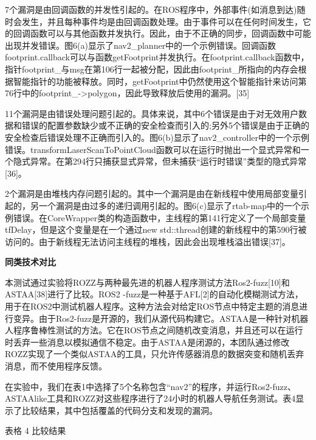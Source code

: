 7个漏洞是由回调函数的并发性引起的。在ROS程序中，外部事件(如消息到达)随时会发生，并且每种事件均是由回调函数处理。由于事件可以在任何时间发生，它的回调函数可以与其他函数并发执行。因此，由于不正确的同步，回调函数中可能出现并发错误。图6(a)显示了nav2\_planner中的一个示例错误。回调函数footprint.callback可以与函数getFootprint并发执行。在footprint.callback函数中，指针footprint\_与msg在第106行一起被分配，因此由footprint\_所指向的内存会根据智能指针的功能被释放。同时，getFootprint中仍然使用这个智能指针来访问第76行中的footprint\_-\textgreater polygon，因此导致释放后使用的漏洞。{[}35{]}

11个漏洞是由错误处理问题引起的。具体来说，其中6个错误是由于对无效用户数据和错误的配置参数缺少或不正确的安全检查而引入的;另外5个错误是由于正确的安全检查后错误处理不正确而引入的。图6(b)显示了nav2\_controller中的一个示例错误。transformLaserScanToPointCloud函数可以在运行时抛出一个显式异常和一个隐式异常。在第294行只捕获显式异常，但未捕获``运行时错误''类型的隐式异常{[}36{]}。

2个漏洞是由堆栈内存问题引起的。其中一个漏洞是由在新线程中使用局部变量引起的，另一个漏洞是由过多的递归调用引起的。图6(c)显示了rtab-map中的一个示例错误。在CoreWrapper类的构造函数中，主线程的第141行定义了一个局部变量tfDelay，但是这个变量是在一个通过new
std::thread创建的新线程中的第590行被访问的。由于新线程无法访问主线程的堆栈，因此会出现堆栈溢出错误{[}37{]}。

\textbf{同类技术对比}

本测试通过实验将ROZZ与两种最先进的机器人程序测试方法Ros2-fuzz{[}10{]}和ASTAA{[}38{]}进行了比较。ROS2
-fuzz是一种基于AFL{[}2{]}的自动化模糊测试方法，用于在ROS2中测试机器人程序。这种方法会对给定ROS节点中特定主题的消息进行变异。由于Ros2-fuzz是开源的，我们从源代码构建它。ASTAA是一种针对机器人程序鲁棒性测试的方法。它在ROS节点之间随机改变消息，并且还可以在运行时丢弃一些消息以模拟通信不稳定。由于ASTAA是闭源的，本团队通过修改ROZZ实现了一个类似ASTAA的工具，只允许传感器消息的数据突变和随机丢弃消息，而不使用程序反馈。

在实验中，我们在表1中选择了5个名称包含``nav2''的程序，并运行Ros2-fuzz、ASTAAlike工具和ROZZ对这些程序进行了24小时的机器人导航任务测试。表4显示了比较结果，其中包括覆盖的代码分支和发现的漏洞。

表格 4 比较结果


